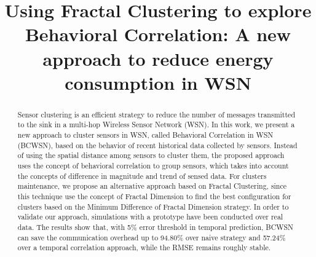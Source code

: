 \documentclass{acm_proc_article-sp}
\begin{document}
%

\title{Using Fractal Clustering to explore Behavioral Correlation: A new
approach to reduce energy consumption in WSN}



\maketitle


\begin{abstract}

Sensor clustering is an efficient strategy to reduce the number of messages
transmitted to the sink in a multi-hop Wireless Sensor Network (WSN).
In this work, we present a new approach to cluster sensors in WSN, called
Behavioral Correlation in WSN (BCWSN), based on the behavior of recent
historical data collected by sensors. Instead of using the spatial distance
among sensors to cluster them, the proposed approach uses the concept of
behavioral correlation to group sensors, which takes into account the concepts
of difference in magnitude and trend of sensed data. For clusters maintenance,
we propose an alternative approach based on Fractal Clustering, since this
technique use the concept of Fractal Dimension to find the best configuration
for clusters based on the Minimum Difference of Fractal Dimension strategy.
In order to validate our approach, simulations with a prototype have been
conducted over real data. The results show that, with 5\% error threshold in
temporal prediction, BCWSN can save the communication overhead up to 94.80\%
over naive strategy and 57.24\% over a temporal correlation approach, while the
RMSE remains roughly stable.


\end{abstract}
\end{document}
